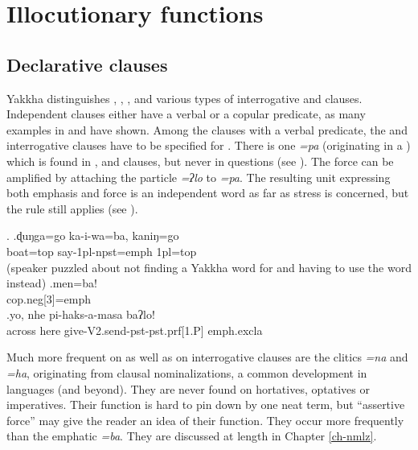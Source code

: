 \section{Illocutionary functions}\label{simp-cl3}
 

\subsection{Declarative clauses }
 Yakkha distinguishes , , , and various types of interrogative and  clauses.
 Independent  clauses either have a verbal or a copular predicate, as many examples in   and  have shown. Among the clauses with a verbal predicate, the  and interrogative clauses have to be specified for . There is one  \emph{=pa} (originating in a ) which is found in ,  and   clauses, but never in questions (see \Next). The  force can be amplified by attaching the  particle \emph{=ʔlo} to \emph{=pa}. The resulting unit expressing both emphasis and  force is an independent word as far as stress is concerned, but the  rule still applies (see \Next[c]). 
 
 \ex. \ag.ɖuŋga=go     ka-i-wa=ba,               kaniŋ=go\\
 boat{\sc =top} say{\sc -1pl-npst=emph} {\sc 1pl=top}\\
  (speaker puzzled about not finding a Yakkha word for  and having to use the  word instead) 
 \bg.men=ba!\\
 {\sc cop.neg[3]=emph}\\
 \bg.yo,   nhe  pi-haks-a-masa       baʔlo!\\
 across here give{\sc -V2.send-pst-pst.prf[1.P]} {\sc emph.excla}\\
  
 
Much more frequent on  as well as on interrogative clauses are the clitics \emph{=na} and \emph{=ha}, originating from clausal nominalizations, a common development in  languages (and beyond). They are never found on hortatives, optatives or imperatives. Their function is hard to pin down by one neat term, but “assertive force” may give the reader an idea of their function. They occur more frequently than the emphatic \emph{=ba}. They are discussed at length in Chapter \ref{ch-nmlz}. 

